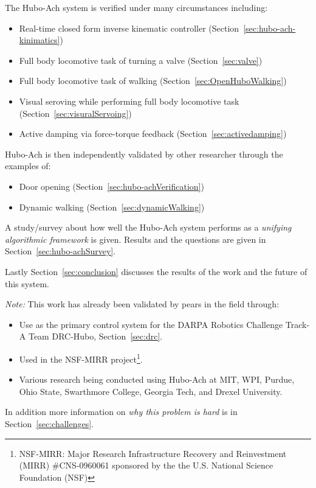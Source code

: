 The Hubo-Ach system is verified under many circumstances including:
\begin{itemize}
	\item Real-time closed form inverse kinematic controller (Section~\ref{sec:hubo-ach-kinimatics})
	\item Full body locomotive task of turning a valve (Section~\ref{sec:valve})
	\item Full body locomotive task of walking (Section~\ref{sec:OpenHuboWalking})
	\item Visual seroving while performing full body locomotive task (Section~\ref{sec:visuralServoing})
	\item Active damping via force-torque feedback (Section~\ref{sec:activedamping})
\end{itemize}




Hubo-Ach is then independently validated by other researcher through the examples of:
\begin{itemize}
	\item Door opening (Section~\ref{sec:hubo-achVerification})
	\item Dynamic walking (Section~\ref{sec:dynamicWalking})
\end{itemize}


A study/survey about how well the Hubo-Ach system performs as a \textit{unifying algorithmic framework} is given.  
Results and the questions are given in Section~\ref{sec:hubo-achSurvey}.

Lastly Section~\ref{sec:conclusion} discusses the results of the work and the future of this system.

\noindent \textit{Note:} This work has already been validated by pears in the field through:
\begin{itemize}
\item Use as the primary control system for the DARPA Robotics Challenge Track-A Team DRC-Hubo, Section~\ref{sec:drc}.
\item Used in the NSF-MIRR project\footnote{NSF-MIRR: Major Research Infrastructure Recovery and Reinvestment (MIRR) \#CNS-0960061 sponsored by the the U.S. National Science Foundation (NSF)}.
\item Various research being conducted using Hubo-Ach at MIT, WPI, Purdue, Ohio State, Swarthmore College, Georgia Tech, and Drexel University.
\end{itemize}
\noindent In addition more information on \textit{why this problem is hard} is in Section~\ref{sec:challenges}.


